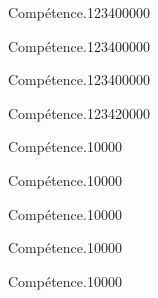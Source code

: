 \begin{pageAD}  %
\restoregeometry %


\begin{ExoCad}{Compétence.}{1234}{0}{0}{0}{0}{0}

\end{ExoCad}


\begin{ExoCad}{Compétence.}{1234}{0}{0}{0}{0}{0}

\end{ExoCad}


\begin{ExoCad}{Compétence.}{1234}{0}{0}{0}{0}{0}

\end{ExoCad}
 
\end{pageAD} %


\begin{pageParcoursu} %

\begin{ExoCu}{Compétence.}{1234}{2}{0}{0}{0}{0}
  
\end{ExoCu}

\begin{ExoCuN}{Compétence.}{1}{0}{0}{0}{0}

\end{ExoCuN}

\begin{ExoCuN}{Compétence.}{1}{0}{0}{0}{0}

\end{ExoCuN}

\begin{ExoCuN}{Compétence.}{1}{0}{0}{0}{0}

\end{ExoCuN}

\begin{ExoCuN}{Compétence.}{1}{0}{0}{0}{0}

\end{ExoCuN}

\begin{ExoCuN}{Compétence.}{1}{0}{0}{0}{0}

\end{ExoCuN}


\end{pageParcoursu} %
 
